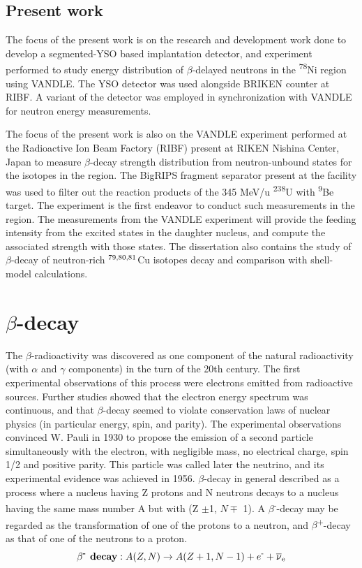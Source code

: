 \subsection{Present work}

The focus of the present work is on the research and development work done to develop a segmented-YSO based implantation detector, and experiment performed to study energy distribution of $\beta$-delayed neutrons in the \textsuperscript{78}Ni region using VANDLE. The YSO detector was used alongside BRIKEN counter at RIBF. A variant of the detector was employed in synchronization with VANDLE for neutron energy measurements.

The focus of the present work is also on the VANDLE experiment performed at the Radioactive Ion Beam Factory (RIBF) present at RIKEN Nishina Center, Japan to measure $\beta$-decay strength distribution from neutron-unbound states for the isotopes in the region. The BigRIPS fragment separator present at the facility was used to filter out the reaction products of the 345 MeV/u  \textsuperscript{238}U with \textsuperscript{9}Be target. The experiment is the first endeavor to conduct such measurements in the region. The measurements from the VANDLE experiment will provide the feeding intensity from the excited states in the daughter nucleus, and compute the associated strength with those states.
The dissertation also contains the study of $\beta$-decay of neutron-rich $\textsuperscript{79,80,81}$Cu isotopes decay and comparison with shell-model calculations. 




\section{$\beta$-decay}
The $\beta$-radioactivity was discovered as one component of the natural radioactivity (with $\alpha$ and $\gamma$ components) in the turn of the 20th century. The first experimental observations of this process were electrons emitted from radioactive sources. Further studies showed that the electron energy spectrum was continuous, and that $\beta$-decay seemed to violate conservation laws of nuclear physics (in particular energy, spin, and parity). The experimental observations convinced W. Pauli in 1930 to propose the emission of a second particle simultaneously with the electron, with negligible mass, no electrical charge, spin 1/2 and positive parity. This particle was called later the neutrino, and its experimental evidence was achieved in 1956. 
$\beta$-decay in general described as a process where a nucleus having Z protons and N neutrons decays to a nucleus having the same mass number A but with (Z $\pm$1, $N\mp$ 1). A $\beta$\textsuperscript{-}-decay may be regarded as the transformation of one of the protons to a neutron, and $\beta$\textsuperscript{+}-decay as that of one of the neutrons to a proton.
\begin{equation}
\textbf{$\beta$\textsuperscript{-} decay}: A(Z,N) \to A(Z + 1, N-1) + e\textsuperscript{-} + \overline{\nu}\textsubscript{e}
\end{equation}

